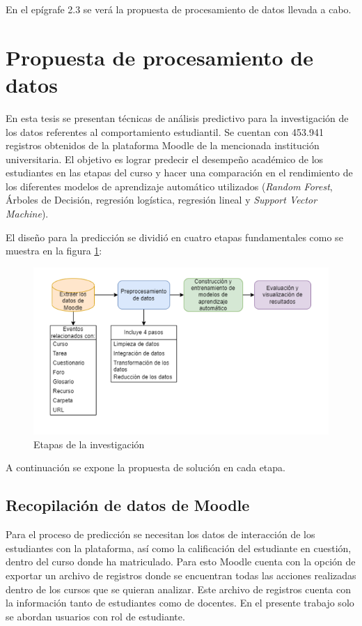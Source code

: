 En el epígrafe 2.3 se verá la propuesta de procesamiento de datos llevada a cabo.  

\section{Propuesta de procesamiento de datos}

En esta tesis se presentan técnicas de análisis predictivo para la investigación de los datos referentes al comportamiento estudiantil. Se cuentan con 453.941 registros obtenidos de la plataforma Moodle de la mencionada institución universitaria. El objetivo es lograr predecir el desempeño académico de los estudiantes en las etapas del curso y hacer una comparación en el rendimiento de los diferentes modelos de aprendizaje automático utilizados (\textit{Random Forest}, Árboles de Decisión, regresión logística, regresión lineal y \textit{Support Vector Machine}).   


El diseño para la predicción se dividió en cuatro etapas fundamentales como se muestra en la figura \ref{Etapas}:
\begin{figure}[htb]
    \centering
    \includegraphics[width = 1 \textwidth]{Graphics/Pasted image 20240103010810.png}
    \caption{Etapas de la investigación}
    \label{Etapas}
\end{figure}

A continuación se expone la propuesta de solución en cada etapa.

\subsection{Recopilación de datos de Moodle}

Para el proceso de predicción se necesitan los datos de interacción de los estudiantes con la plataforma, así como la calificación del estudiante en cuestión, dentro del curso donde ha matriculado. Para esto Moodle cuenta con la opción de exportar un archivo de registros donde se encuentran todas las acciones realizadas dentro de los cursos que se quieran analizar. Este archivo de registros cuenta con la información tanto de estudiantes como de docentes. En el presente trabajo solo se abordan usuarios con rol de estudiante.  


